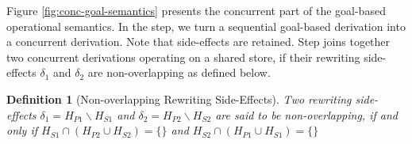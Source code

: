 \documentclass{tlp}
\newtheorem{definition}{Definition}[section]
\begin{document}

Figure \ref{fig:conc-goal-semantics} presents the concurrent part of the goal-based operational 
semantics. In the  step, we turn a sequential goal-based derivation into a 
concurrent derivation. Note that side-effects are retained. Step  joins 
together two concurrent derivations operating on a shared store, if
their rewriting side-effects $\delta_1$ and $\delta_2$ are 
non-overlapping as defined below.

\begin{definition} [Non-overlapping Rewriting Side-Effects] \label{def:non-overlap-side-effects}
   Two rewriting side-effects $\delta_1 = H_{P1} \backslash H_{S1}$ and 
   $\delta_2 = H_{P2} \backslash H_{S2}$ are said to be non-overlapping,
   if and only if $H_{S1} \cap (H_{P2} \cup H_{S2}) = \{\}$ and 
   $H_{S2} \cap (H_{P1} \cup H_{S1}) = \{\}$ 
\end{definition}
\end{document}
